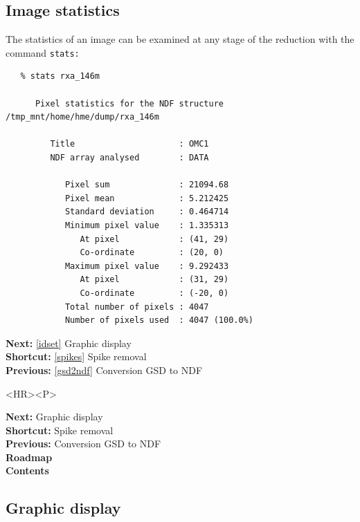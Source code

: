 \documentclass[11pt]{article}
\newenvironment{latexonly}{}{}
\newcommand{\htmlref}[2]{#1}
\newcommand{\xref}[3]{#1}
\newcommand{\xlabel}[1]{}
\begin{document}
\subsection{\label{stats}\xlabel{stats}Image statistics}

   The statistics of an image can be examined at any stage of the
   reduction with the command
{\tt \xref{stats:}{sun95}{STATS}}

\begin{verbatim}
   % stats rxa_146m

      Pixel statistics for the NDF structure /tmp_mnt/home/hme/dump/rxa_146m

         Title                     : OMC1
         NDF array analysed        : DATA

            Pixel sum              : 21094.68
            Pixel mean             : 5.212425
            Standard deviation     : 0.464714
            Minimum pixel value    : 1.335313
               At pixel            : (41, 29)
               Co-ordinate         : (20, 0)
            Maximum pixel value    : 9.292433
               At pixel            : (31, 29)
               Co-ordinate         : (-20, 0)
            Total number of pixels : 4047
            Number of pixels used  : 4047 (100.0%)
\end{verbatim}

\begin{latexonly}
{\bf Next:} \ref{idset} Graphic display\\
{\bf Shortcut:} \ref{spikes} Spike removal\\
{\bf Previous:} \ref{gsd2ndf} Conversion GSD to NDF\\
\end{latexonly}

\begin{htmlonly}
\begin{rawhtml} <HR><P> \end{rawhtml}
{\bf \htmlref{Next:}{idset}} Graphic display\\
{\bf \htmlref{Shortcut:}{spikes}} Spike removal\\
{\bf \htmlref{Previous:}{gsd2ndf}} Conversion GSD to NDF\\
{\bf \htmlref{Roadmap}{roadmap}}\\
{\bf \htmlref{Contents}{stardoccontents}}\\
\end{htmlonly}


\subsection{\label{idset}\xlabel{idset}Graphic display}
\end{document}
